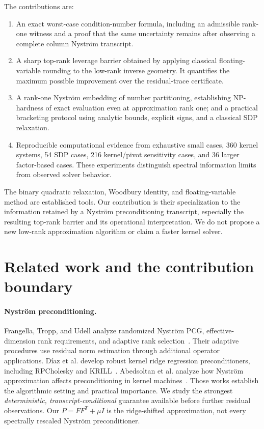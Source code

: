 \documentclass[11pt]{article}
\theoremstyle{definition}\newtheorem{definition}[theorem]{Definition}
\begin{document}
The contributions are:
\begin{enumerate}
\item An exact worst-case condition-number formula, including an admissible rank-one witness and a proof that the same uncertainty remains after observing a complete column Nystr\"om transcript.
\item A sharp top-rank leverage barrier obtained by applying classical floating-variable rounding to the low-rank inverse geometry. It quantifies the maximum possible improvement over the residual-trace certificate.
\item A rank-one Nystr\"om embedding of number partitioning, establishing NP-hardness of exact evaluation even at approximation rank one; and a practical bracketing protocol using analytic bounds, explicit signs, and a classical SDP relaxation.
\item Reproducible computational evidence from exhaustive small cases, 360 kernel systems, 54 SDP cases, 216 kernel/pivot sensitivity cases, and 36 larger factor-based cases. These experiments distinguish spectral information limits from observed solver behavior.
\end{enumerate}
The binary quadratic relaxation, Woodbury identity, and floating-variable method are established tools. Our contribution is their specialization to the information retained by a Nystr\"om preconditioning transcript, especially the resulting top-rank barrier and its operational interpretation. We do not propose a new low-rank approximation algorithm or claim a faster kernel solver.

\section{Related work and the contribution boundary}
\paragraph{Nystr\"om preconditioning.}
Frangella, Tropp, and Udell analyze randomized Nystr\"om PCG, effective-dimension rank requirements, and adaptive rank selection~\cite{ftu}. Their adaptive procedures use residual norm estimation through additional operator applications. D\'iaz et al. develop robust kernel ridge regression preconditioners, including RPCholesky and KRILL~\cite{diaz}. Abedsoltan et al. analyze how Nystr\"om approximation affects preconditioning in kernel machines~\cite{abed}. Those works establish the algorithmic setting and practical importance. We study the strongest \emph{deterministic, transcript-conditional} guarantee available before further residual observations. Our $P=FF^T+\mu I$ is the ridge-shifted approximation, not every spectrally rescaled Nystr\"om preconditioner.
\end{document}
